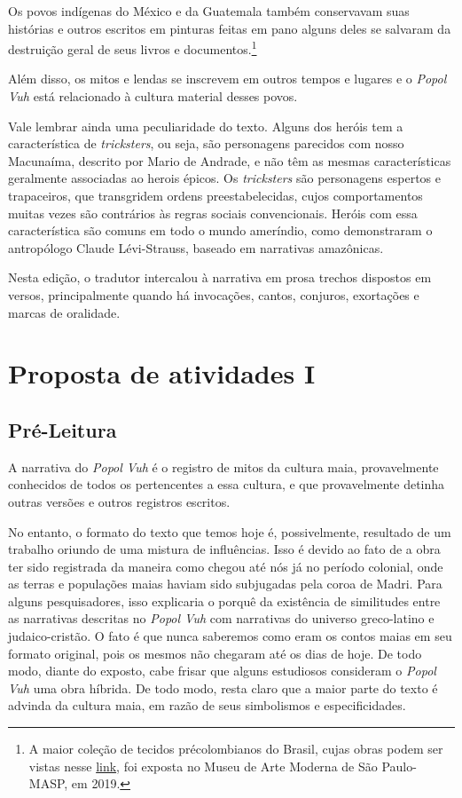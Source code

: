 \documentclass[12pt]{extarticle}
\begin{document}
Os povos indígenas do México e da Guatemala também conservavam suas histórias e outros escritos em pinturas feitas em pano alguns deles se salvaram da destruição geral de seus livros e documentos.\footnote{A maior coleção de tecidos précolombianos do Brasil, cujas obras podem ser vistas nesse \href{https://masp.org.br/exposicoes/acervo-em-transformacao-comodato-masp-landmann-texteis-pre-colombianos}{link}, foi exposta no Museu de Arte Moderna de São Paulo-MASP, em 2019.}

Além disso, os mitos e lendas se inscrevem em outros tempos e lugares e o 
\textit{Popol Vuh} está relacionado à cultura material desses povos.

Vale lembrar ainda uma peculiaridade do texto. Alguns dos heróis tem a característica de \textit{tricksters}, ou seja, são personagens parecidos com nosso Macunaíma, descrito por Mario de Andrade, e não têm as mesmas características geralmente associadas ao herois épicos. Os \textit{tricksters} são personagens espertos e trapaceiros, que transgridem ordens preestabelecidas, cujos comportamentos muitas vezes são contrários às regras sociais convencionais.
Heróis com essa característica são comuns em todo o mundo ameríndio, como demonstraram o antropólogo Claude Lévi-Strauss, baseado em narrativas amazônicas.

Nesta edição, o tradutor intercalou à narrativa em prosa trechos dispostos em versos, principalmente quando há invocações, cantos, conjuros, exortações e marcas de oralidade.


\section{Proposta de atividades I}

\subsection{Pré-Leitura}


A narrativa do \emph{Popol Vuh} é o registro de mitos da
cultura maia, provavelmente conhecidos de todos os pertencentes a essa
cultura, e que provavelmente detinha outras versões e outros registros
escritos.

No entanto, o formato do texto que temos hoje é, possivelmente,
resultado de um trabalho oriundo de uma mistura de influências. Isso é
devido ao fato de a obra ter sido registrada da maneira como chegou até
nós já no período colonial, onde as terras e populações maias haviam
sido subjugadas pela coroa de Madri. Para alguns pesquisadores, isso
explicaria o porquê da existência de similitudes entre as narrativas
descritas no \emph{Popol Vuh} com narrativas do universo greco-latino e
judaico-cristão. O fato é que nunca saberemos como eram os contos maias
em seu formato original, pois os mesmos não chegaram até os dias de
hoje. De todo modo, diante do exposto, cabe frisar que alguns estudiosos
consideram o \emph{Popol Vuh} uma obra híbrida. De todo modo, resta
claro que a maior parte do texto é advinda da cultura maia, em razão de
seus simbolismos e especificidades.
\end{document}
